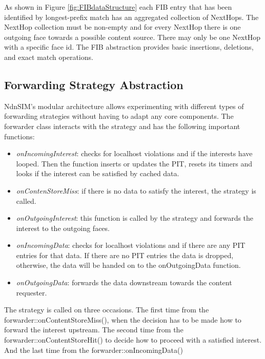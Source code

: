 \vspace{5mm} %

As shown in Figure \ref{fig:FIBdataStructure} each FIB entry that has been identified by longest-prefix match has an aggregated collection of NextHops. The NextHop collection must be non-empty and for every NextHop there is one outgoing face towards a possible content source. There may only be one NextHop with a specific face id. The FIB abstraction provides basic insertions, deletions, and exact match operations.

\subsection{Forwarding Strategy Abstraction}

NdnSIM's modular architecture allows experimenting with different types of forwarding strategies without having to adapt any core components. The forwarder class interacts with the strategy and has the following important functions:

\begin{itemize}
\item \emph{onIncomingInterest}: checks for localhost violations and if the interests have looped. Then the function inserts or updates the PIT, resets its timers and looks if the interest can be satisfied by cached data.
\item \emph{onContenStoreMiss}: if there is no data to satisfy the interest, the strategy is called.
\item \emph{onOutgoingInterest}: this function is called by the strategy and forwards the interest to the outgoing faces.
\item \emph{onIncomingData}: checks for localhost violations and if there are any PIT entries for that data. If there are no PIT entries the data is dropped, otherwise, the data will be handed on to the onOutgoingData function.
\item \emph{onOutgoingData}: forwards the data downstream towards the content requester.
\end{itemize}


The strategy is called on three occasions. The first time from the forwarder::onContentStoreMiss(), when the decision has to be made how to forward the interest upstream. The second time from the forwarder::onContentStoreHit() to decide how to proceed with a satisfied interest. And the last time from the forwarder::onIncomingData()

\vspace{5mm} %

